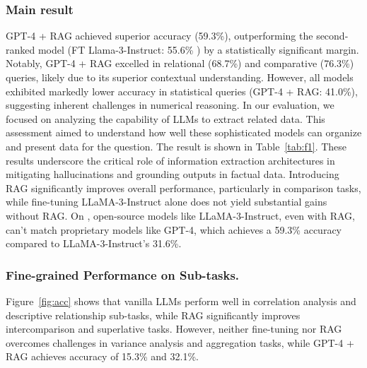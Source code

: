 \subsubsection{Main result}
GPT-4 + RAG achieved superior accuracy (59.3\%), outperforming the second-ranked model (FT Llama-3-Instruct: 55.6\% ) by a statistically significant margin. Notably, GPT-4 + RAG excelled in relational (68.7\%) and comparative (76.3\%) queries, likely due to its superior contextual understanding. However, all models exhibited markedly lower accuracy in statistical queries (GPT-4 + RAG: 41.0\%), suggesting inherent challenges in numerical reasoning. In our evaluation, we focused on analyzing the capability of LLMs to extract related data. This assessment aimed to understand how well these sophisticated models can organize and present data for the question. The result is shown in Table~\ref{tab:f1}. These results underscore the critical role of information extraction architectures in mitigating hallucinations and grounding outputs in factual data. 
Introducing RAG significantly improves overall performance, particularly in comparison tasks, while fine-tuning LLaMA-3-Instruct alone does not yield substantial gains without RAG. On \meqa, open-source models like LLaMA-3-Instruct, even with RAG, can't match proprietary models like GPT-4, which achieves a 59.3\% accuracy compared to LLaMA-3-Instruct's 31.6\%.

\subsubsection{Fine-grained Performance on Sub-tasks.}

Figure~\ref{fig:acc} shows that vanilla LLMs perform well in correlation analysis and descriptive relationship sub-tasks, while RAG significantly improves intercomparison and superlative tasks. However, neither fine-tuning nor RAG overcomes challenges in variance analysis and aggregation tasks, while GPT-4 + RAG achieves accuracy of 15.3\% and 32.1\%.

